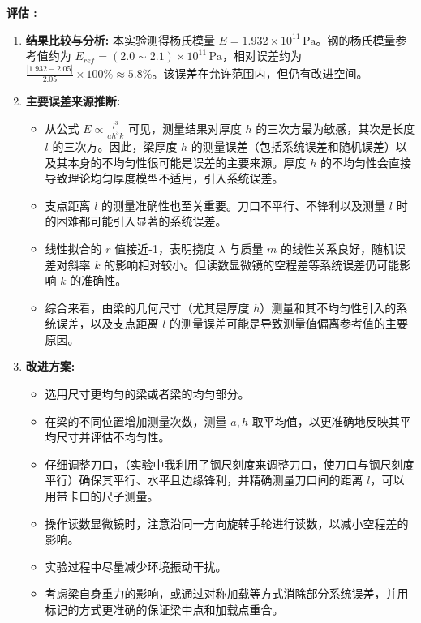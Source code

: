 \documentclass[12pt]{article}
\begin{document}
\textbf{评估 :}
\begin{enumerate}
    \item \textbf{结果比较与分析:} 本实验测得杨氏模量 $E = 1.932 \times 10^{11}\,\text{Pa}$。钢的杨氏模量参考值约为 $E_{ref} = (2.0 \sim 2.1) \times 10^{11}\,\text{Pa}$，相对误差约为 $\frac{|1.932 - 2.05|}{2.05} \times 100\% \approx 5.8\%$。该误差在允许范围内，但仍有改进空间。
    \item \textbf{主要误差来源推断:}
        \begin{itemize}
            \item 从公式 $E \propto \frac{l^3}{a h^3 k}$ 可见，测量结果对厚度 $h$ 的三次方最为敏感，其次是长度 $l$ 的三次方。因此，梁厚度 $h$ 的测量误差（包括系统误差和随机误差）以及其本身的不均匀性很可能是误差的主要来源。厚度 $h$ 的不均匀性会直接导致理论均匀厚度模型不适用，引入系统误差。
            \item 支点距离 $l$ 的测量准确性也至关重要。刀口不平行、不锋利以及测量 $l$ 时的困难都可能引入显著的系统误差。
            \item 线性拟合的 $r$ 值接近-1，表明挠度 $\lambda$ 与质量 $m$ 的线性关系良好，随机误差对斜率 $k$ 的影响相对较小。但读数显微镜的空程差等系统误差仍可能影响 $k$ 的准确性。
            \item 综合来看，由梁的几何尺寸（尤其是厚度 $h$）测量和其不均匀性引入的系统误差，以及支点距离 $l$ 的测量误差可能是导致测量值偏离参考值的主要原因。
        \end{itemize}
    \item \textbf{改进方案:}
        \begin{itemize}
            \item 选用尺寸更均匀的梁或者梁的均匀部分。
            \item 在梁的不同位置增加测量次数，测量 $a, h$ 取平均值，以更准确地反映其平均尺寸并评估不均匀性。
            \item 仔细调整刀口，（实验中\underline{我利用了钢尺刻度来调整刀口}，使刀口与钢尺刻度平行）确保其平行、水平且边缘锋利，并精确测量刀口间的距离 $l$，可以用带卡口的尺子测量。
            \item 操作读数显微镜时，注意沿同一方向旋转手轮进行读数，以减小空程差的影响。
            \item 实验过程中尽量减少环境振动干扰。
            \item 考虑梁自身重力的影响，或通过对称加载等方式消除部分系统误差，并用标记的方式更准确的保证梁中点和加载点重合。
        \end{itemize}
\end{enumerate}
\end{document}
